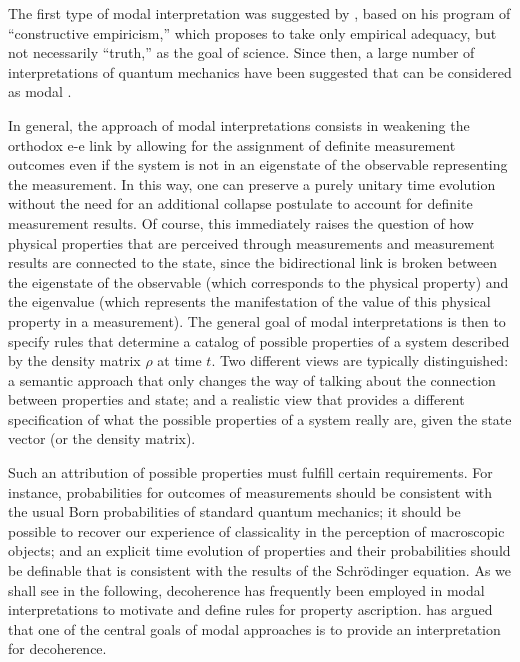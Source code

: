 \documentclass[twocolumn,rmp,aps,amsmath,amsfonts,noshowkeys,noshowpacs]{revtex4}
\begin{document}
The first type of modal interpretation was suggested by
\citet{Fraassen:1973:yb,Fraassen:1991:ys}, based on his program of
``constructive empiricism,'' which proposes to take only empirical
adequacy, but not necessarily ``truth,'' as the goal of science. Since
then, a large number of interpretations of quantum mechanics have been
suggested that can be considered as modal \citep[for a review and
discussion of some of the basic properties and problems of such
interpretations, see][]{Clifton:1996:op}.

In general, the approach of modal interpretations consists in
weakening the orthodox {e-e} link by allowing for the assignment of
definite measurement outcomes even if the system is not in an
eigenstate of the observable representing the measurement.  In this
way, one can preserve a purely unitary time evolution without the need
for an additional collapse postulate to account for definite
measurement results. Of course, this immediately raises the question
of how physical properties that are perceived through measurements and
measurement results are connected to the state, since the
bidirectional link is broken between the eigenstate of the observable
(which corresponds to the physical property) and the eigenvalue (which
represents the manifestation of the value of this physical property in
a measurement). The general goal of modal interpretations is then to
specify rules that determine a catalog of possible properties of a
system described by the density matrix $\rho$ at time $t$. Two
different views are typically distinguished: a semantic approach that
only changes the way of talking about the connection between
properties and state; and a realistic view that provides a different
specification of what the possible properties of a system really are,
given the state vector (or the density matrix).

Such an attribution of possible properties must fulfill certain
requirements. For instance, probabilities for outcomes of measurements
should be consistent with the usual Born probabilities of standard
quantum mechanics; it should be possible to recover our experience of
classicality in the perception of macroscopic objects; and an explicit
time evolution of properties and their probabilities should be
definable that is consistent with the results of the Schr\"odinger
equation. As we shall see in the following, decoherence has frequently
been employed in modal interpretations to motivate and define rules
for property ascription. \citet{Dieks:1994:oz,Dieks:1994:rc} has
argued that one of the central goals of modal approaches is to provide
an interpretation for decoherence.
\end{document}
